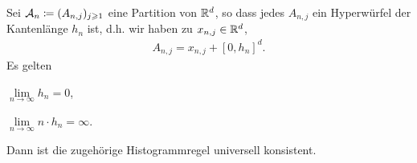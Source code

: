 \begin{prop}
\label{prop:1.3.6}
Sei $\mathcal{A}_n \coloneq (A_{n,j})_{j\geqslant1}$ eine Partition von $\mathbb{R}^d$, so dass jedes
$A_{n,j}$ ein Hyperwürfel der Kantenlänge $h_n$ ist, d.h. wir haben zu
$x_{n,j}\in\mathbb{R}^d$,
\begin{align*}
A_{n,j} = x_{n,j} + [0,h_n]^d.
\end{align*}
Es gelten
\begin{propenum}
\item $\lim\limits_{n\to\infty} h_n  = 0$,
\item $\lim\limits_{n\to\infty} n\cdot h_n  = \infty$.
\end{propenum}
Dann ist die zugehörige Histogrammregel universell konsistent.\fishhere
\end{prop}
